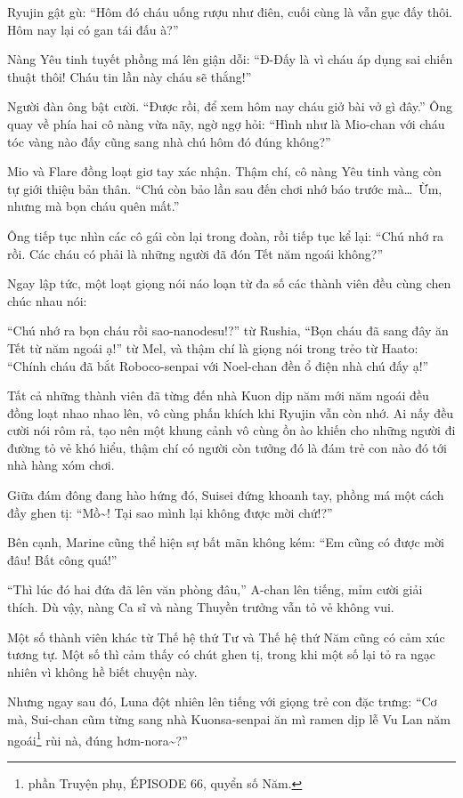 \documentclass[../main.tex]{subfiles}
\begin{document}
Ryujin gật gù: ``Hôm đó cháu uống rượu như điên, cuối cùng là vẫn gục đấy thôi. Hôm nay lại có gan tái đấu à?''

Nàng Yêu tinh tuyết phồng má lên giận dỗi: ``Đ-Đấy là vì cháu áp dụng sai chiến thuật thôi! Cháu tin lần này cháu sẽ thắng!''

Người đàn ông bật cười. ``Được rồi, để xem hôm nay cháu giở bài vở gì đây.'' Ông quay về phía hai cô nàng vừa nãy, ngờ ngợ hỏi: ``Hình như là Mio-chan với cháu tóc vàng nào đấy cũng sang nhà chú hôm đó đúng không?''

Mio và Flare đồng loạt giơ tay xác nhận. Thậm chí, cô nàng Yêu tinh vàng còn tự giới thiệu bản thân. ``Chú còn bảo lần sau đến chơi nhớ báo trước mà\dots\ Ừm, nhưng mà bọn cháu quên mất.''

Ông tiếp tục nhìn các cô gái còn lại trong đoàn, rồi tiếp tục kể lại: ``Chú nhớ ra rồi. Các cháu có phải là những người đã đón Tết năm ngoái không?''

Ngay lập tức, một loạt giọng nói náo loạn từ đa số các thành viên đều cùng chen chúc nhau nói:

``Chú nhớ ra bọn cháu rồi sao-nanodesu!?'' từ Rushia, ``Bọn cháu đã sang đây ăn Tết từ năm ngoái ạ!'' từ Mel, và thậm chí là giọng nói trong trẻo từ Haato: ``Chính cháu đã bắt Roboco-senpai với Noel-chan đền ổ điện nhà chú đấy ạ!''

Tất cả những thành viên đã từng đến nhà Kuon dịp năm mới năm ngoái đều đồng loạt nhao nhao lên, vô cùng phấn khích khi Ryujin vẫn còn nhớ. Ai nấy đều cười nói rôm rả, tạo nên một khung cảnh vô cùng ồn ào khiến cho những người đi đường tỏ vẻ khó hiểu, thậm chí có người còn tưởng đó là đám trẻ con nào đó tới nhà hàng xóm chơi.

Giữa đám đông đang hào hứng đó, Suisei đứng khoanh tay, phồng má một cách đầy ghen tị: ``Mồ\~{}! Tại sao mình lại không được mời chứ!?''

Bên cạnh, Marine cũng thể hiện sự bất mãn không kém: ``Em cũng có được mời đâu! Bất công quá!''

``Thì lúc đó hai đứa đã lên văn phòng đâu,'' A-chan lên tiếng, mỉm cười giải thích. Dù vậy, nàng Ca sĩ và nàng Thuyền trưởng vẫn tỏ vẻ không vui.

Một số thành viên khác từ Thế hệ thứ Tư và Thế hệ thứ Năm cũng có cảm xúc tương tự. Một số thì cảm thấy có chút ghen tị, trong khi một số lại tỏ ra ngạc nhiên vì không hề biết chuyện này.

Nhưng ngay sau đó, Luna đột nhiên lên tiếng với giọng trẻ con đặc trưng: ``Cơ mà, Sui-chan cũm từng sang nhà Kuonsa-senpai ăn mì ramen dịp lễ Vu Lan năm ngoái\footnote{phần {\abv Truyện phụ}, {\flaregothic ÉPISODE 66}, quyển số Năm.} rùi nà, đúng hơm-nora\~{}?''
\end{document}
